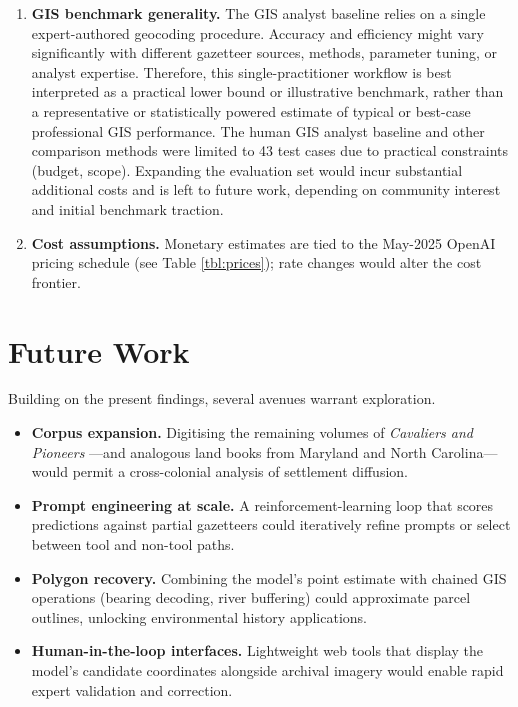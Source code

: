 \begin{enumerate}
  underlying database updates, complicating longitudinal
  reproducibility.
\item
  \textbf{GIS benchmark generality.} The GIS analyst baseline
  \citep{Bashorun2025_gis} relies on a single expert-authored geocoding
  procedure. Accuracy and efficiency might vary significantly with
  different gazetteer sources, methods, parameter tuning, or analyst
  expertise. Therefore, this single-practitioner workflow is best
  interpreted as a practical lower bound or illustrative benchmark,
  rather than a representative or statistically powered estimate of
  typical or best-case professional GIS performance. The human GIS
  analyst baseline and other comparison methods were limited to 43 test
  cases due to practical constraints (budget, scope). Expanding the
  evaluation set would incur substantial additional costs and is left to
  future work, depending on community interest and initial benchmark
  traction.
\item
  \textbf{Cost assumptions.} Monetary estimates are tied to the May-2025
  OpenAI pricing schedule (see Table \ref{tbl:prices}); rate changes
  would alter the cost frontier.
\end{enumerate}

\section{Future Work}\label{future-work}

Building on the present findings, several avenues warrant exploration.

\begin{itemize}
\tightlist
\item
  \textbf{Corpus expansion.} Digitising the remaining volumes of
  \emph{Cavaliers and Pioneers} \citep{Nugent1979_cavaliers3}---and
  analogous land books from Maryland and North Carolina---would permit a
  cross-colonial analysis of settlement diffusion.
\item
  \textbf{Prompt engineering at scale.} A reinforcement-learning loop
  that scores predictions against partial gazetteers could iteratively
  refine prompts or select between tool and non-tool paths.
\item
  \textbf{Polygon recovery.} Combining the model's point estimate with
  chained GIS operations (bearing decoding, river buffering) could
  approximate parcel outlines, unlocking environmental history
  applications.
\item
  \textbf{Human-in-the-loop interfaces.} Lightweight web tools that
  display the model's candidate coordinates alongside archival imagery
  would enable rapid expert validation and correction.
\end{itemize}

